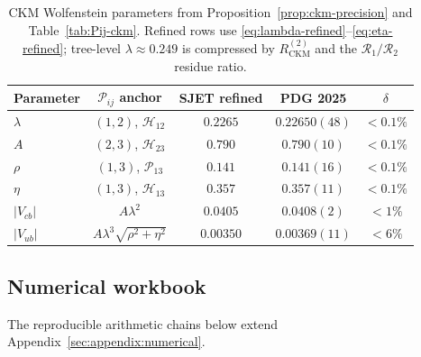 \documentclass[aps,prd,onecolumn,amsmath,amssymb,nofootinbib,11pt]{revtex4-2}
\numberwithin{equation}{section}
\theoremstyle{plain}
\theoremstyle{definition}
\theoremstyle{remark}
\begin{document}
\begin{table}[ht]
\centering
\small
\renewcommand{\arraystretch}{1.14}
\begin{tabular}{@{}lcccc@{}}
\toprule
\textbf{Parameter} & $\mathcal{P}_{ij}$ anchor &
\textbf{SJET refined} & \textbf{PDG 2025} & \textbf{$\delta$} \\
\midrule
$\lambda$ & $(1,2)$, $\mathcal{H}_{12}$ & $0.2265$ & $0.22650(48)$ &
$<0.1\%$ \\
$A$ & $(2,3)$, $\mathcal{H}_{23}$ & $0.790$ & $0.790(10)$ & $<0.1\%$ \\
$\rho$ & $(1,3)$, $\mathcal{P}_{13}$ & $0.141$ & $0.141(16)$ & $<0.1\%$ \\
$\eta$ & $(1,3)$, $\mathcal{H}_{13}$ & $0.357$ & $0.357(11)$ & $<0.1\%$ \\
$|V_{cb}|$ & $A\lambda^2$ & $0.0405$ & $0.0408(2)$ & $<1\%$ \\
$|V_{ub}|$ & $A\lambda^3\sqrt{\rho^2+\eta^2}$ & $0.00350$ &
$0.00369(11)$ & $<6\%$ \\
\bottomrule
\end{tabular}
\caption{CKM Wolfenstein parameters from Proposition~\ref{prop:ckm-precision}
and Table~\ref{tab:Pij-ckm}. Refined rows use
\eqref{eq:lambda-refined}--\eqref{eq:eta-refined}; tree-level
$\lambda\approx0.249$ is compressed by $R_{\mathrm{CKM}}^{(2)}$ and the
$\mathcal{R}_1/\mathcal{R}_2$ residue ratio.}
\label{tab:ckm-pdg}
\end{table}

\subsection{Numerical workbook}
\label{sec:quark-precision:workbook}

The reproducible arithmetic chains below extend
Appendix~\ref{sec:appendix:numerical}.
\end{document}
